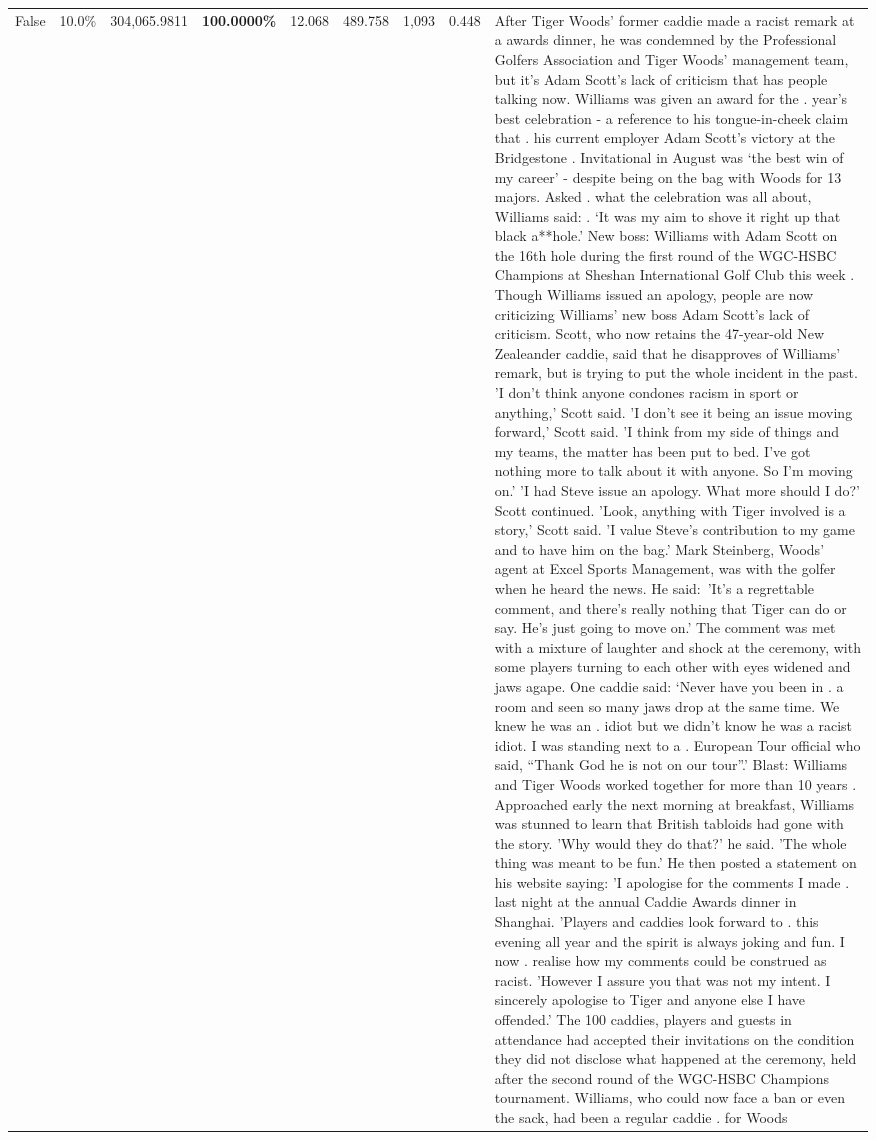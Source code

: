 \begin{table}[H]
\begin{tabular}{lllrlllll}
False & 10.0\% & \color{red} 304,065.9811 & \bfseries \color{red} 100.0000\% & 12.068 & 489.758 & 1,093 & 0.448 & After Tiger Woods' former caddie made a racist remark at a awards dinner, he was condemned by the Professional Golfers Association and Tiger Woods' management team, but it's Adam Scott's lack of criticism that has people talking now. Williams was given an award for the . year’s best celebration - a reference to his tongue-in-cheek claim that . his current employer Adam Scott’s victory at the Bridgestone . Invitational in August was ‘the best win of my career’ - despite being on the bag with Woods for 13 majors. Asked . what the celebration was all about, Williams said: . ‘It was my aim to shove it right up that black a**hole.’ New boss: Williams with Adam Scott  on the 16th hole during the first round of the WGC-HSBC Champions at Sheshan International Golf Club this week . Though Williams issued an apology, people are now criticizing Williams' new boss Adam Scott's lack of criticism. Scott, who now retains the 47-year-old New Zealeander caddie, said that he disapproves of Williams' remark, but is trying to put the whole incident in the past. 'I don't think anyone condones racism in sport or anything,' Scott said. 'I don't see it being an issue moving forward,' Scott said. 'I think from my side of things and my teams, the matter has been put to bed. I've got nothing more to talk about it with anyone. So I'm moving on.' 'I had Steve issue an apology. What more should I do?' Scott continued. 'Look, anything with Tiger involved is a story,' Scott said. 'I value Steve's contribution to my game and to have him on the bag.' Mark Steinberg, Woods' agent at Excel Sports Management, was with the golfer when he heard the news. He said: 'It's a regrettable comment, and there's really nothing that Tiger can do or say. He's just going to move on.' The comment was met with a mixture of laughter and shock at the ceremony, with some players turning to each other with eyes widened and jaws agape. One caddie said: ‘Never have you been in . a room and seen so many jaws drop at the same time. We knew he was an . idiot but we didn’t know he was a racist idiot. I was standing next to a . European Tour official who said, “Thank God he is not on our tour”.’ Blast: Williams and Tiger Woods worked together for more than 10 years . Approached early the next morning at breakfast, Williams was stunned to learn that British tabloids had gone with the story. 'Why would they do that?' he said. 'The whole thing was meant to be fun.' He then posted a statement on his website saying: 'I apologise for the comments I made . last night at the annual Caddie Awards dinner in Shanghai. 'Players and caddies look forward to . this evening all year and the spirit is always joking and fun. I now . realise how my comments could be construed as racist. 'However I assure you that was not my intent. I sincerely apologise to Tiger and anyone else I have offended.' The 100 caddies, players and guests in attendance had accepted their invitations on the condition they did not disclose what happened at the ceremony, held after the second round of the WGC-HSBC Champions tournament. Williams, who could now face a ban or even the sack, had been a regular caddie . for Woods 
\end{tabular}
\end{table}
